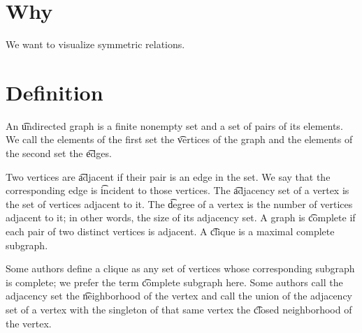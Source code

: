 
\sbasic





















\sstart
{}

\section{Why}

We want to visualize symmetric relations.

\section{Definition}

An \t{undirected graph} is a finite nonempty set and a set of pairs of its elements.
We call the elements of the first set the \t{vertices} of the graph and the elements of the second set the \t{edges}.

Two vertices are \t{adjacent} if their pair is an edge in the set.
We say that the corresponding edge is \t{incident} to those vertices.
The \t{adjacency set} of a vertex is the set of vertices adjacent to it.
The \t{degree} of a vertex is the number of vertices adjacent to it; in other words, the size of its adjacency set.
A graph is \t{complete} if each pair of two distinct vertices is adjacent.
A \t{clique} is a maximal complete subgraph.


Some authors define a clique as any set of vertices whose corresponding subgraph is complete; we prefer the term \t{complete subgraph} here.
Some authors call the adjacency set the \t{neighborhood} of the vertex and call the union of the adjacency set of a vertex with the singleton of that same vertex the \t{closed neighborhood} of the vertex.


